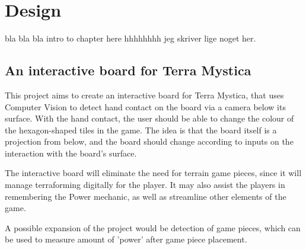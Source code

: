 \chapter{Design}\label{ch:design}
bla bla bla intro to chapter here hhhhhhhh jeg skriver lige noget her.

\section{An interactive board for Terra Mystica}
This project aims to create an interactive board for Terra Mystica, that uses Computer Vision to detect hand contact on the board via a camera below its surface. With the hand contact, the user should be able to change the colour of the hexagon-shaped tiles in the game. The idea is that the board itself is a projection from below, and the board should change according to inputs on the interaction with the board's surface.

The interactive board will eliminate the need for terrain game pieces, since it will manage terraforming digitally for the player. It may also assist the players in remembering the Power mechanic, as well as streamline other elements of the game.

A possible expansion of the project would be detection of game pieces, which can be used to measure amount of 'power' after game piece placement.